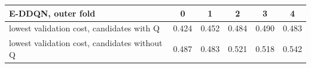 \begin{tabular}{lccccc}
\toprule
E-DDQN, outer fold & 0 & 1 & 2 & 3 & 4 \\
\midrule
lowest validation cost, candidates with Q & 0.424 & 0.452 & 0.484 & 0.490 & 0.483 \\
lowest validation cost, candidates without Q & 0.487 & 0.483 & 0.521 & 0.518 & 0.542 \\
\bottomrule
\end{tabular}
